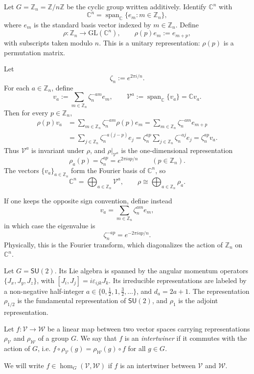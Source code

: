 \begin{example}
Let \(G=\mathbb Z_n=\mathbb Z/n\mathbb Z\) be the cyclic group written additively.
Identify \(\mathbb C^n\) with
\[
\mathbb C^n=\operatorname{span}_{\mathbb C}\{e_m:m\in\mathbb Z_n\},
\]
where \(e_m\) is the standard basis vector indexed by \(m\in\mathbb Z_n\).
Define
\[
\rho:\mathbb Z_n\to \mathrm{GL}(\mathbb C^n),
\qquad
\rho(p)e_m:=e_{m+p},
\]
with subscripts taken modulo \(n\). This is a unitary representation: \(\rho(p)\) is a permutation matrix.

Let
\[
\zeta_n:=e^{2\pi i/n}.
\]
For each \(a\in\mathbb Z_n\), define
\[
v_a:=\sum_{m\in\mathbb Z_n}\zeta_n^{-am}e_m,
\qquad
\mathscr{V}^a:=\operatorname{span}_{\mathbb C}\{v_a\}=\mathbb C v_a.
\]
Then for every \(p\in\mathbb Z_n\),
\[
\begin{aligned}
\rho(p)v_a
&=\sum_{m\in\mathbb Z_n}\zeta_n^{-am}\rho(p)e_m
=\sum_{m\in\mathbb Z_n}\zeta_n^{-am}e_{m+p} \\
&=\sum_{j\in\mathbb Z_n}\zeta_n^{-a(j-p)}e_j
=\zeta_n^{ap}\sum_{j\in\mathbb Z_n}\zeta_n^{-aj}e_j
=\zeta_n^{ap}v_a.
\end{aligned}
\]
Thus \(\mathscr{V}^a\) is invariant under \(\rho\), and \(\rho|_{\mathscr{V}^a}\) is the one-dimensional representation
\[
\rho_a(p)=\zeta_n^{ap}=e^{2\pi i ap/n}
\qquad (p\in\mathbb Z_n).
\]
The vectors \(\{v_a\}_{a\in\mathbb Z_n}\) form the Fourier basis of \(\mathbb C^n\), so
\[
\mathbb C^n=\bigoplus_{a\in\mathbb Z_n}\mathscr{V}^a,
\qquad
\rho\cong\bigoplus_{a\in\mathbb Z_n}\rho_a.
\]

If one keeps the opposite sign convention, define instead
\[
v_a=\sum_{m\in\mathbb Z_n}\zeta_n^{am}e_m,
\]
in which case the eigenvalue is
\[
\zeta_n^{-ap}=e^{-2\pi i ap/n}.
\]
Physically, this is the Fourier transform, which diagonalizes the action of $\mathbb{Z}_n$ on $\mathbb{C}^n$.
\end{example}

\begin{example}
Let $G = \mathsf{SU}(2)$. Its Lie algebra is spanned by the angular momentum operators $\{J_x,J_y,J_z\}$, with $[J_i,J_j]=i\varepsilon_{ijk}J_k$. Its irreducible representations are labeled by a non-negative half-integer $a\in\{0,\tfrac12,1,\tfrac32,\ldots\}$, and $d_a=2a+1$. The representation $\rho_{1/2}$ is the fundamental representation of $\mathsf{SU}(2)$, and $\rho_1$ is the adjoint representation. 
\end{example}

\begin{definition}
    Let $f:\mathscr{V}\to\mathscr{W}$ be a linear map between two vector spaces carrying representations $\rho_\mathscr{V}$ and $\rho_\mathscr{W}$ of a group $G$. We say that $f$ is an \emph{intertwiner} if it commutes with the action of $G$, i.e. $f\circ \rho_\mathscr{V}(g) = \rho_\mathscr{W}(g)\circ f$ for all $g\in G$.
\end{definition}
We will write $f\in\hom_G(\mathscr{V},\mathscr{W})$ if $f$ is an intertwiner between $\mathscr{V}$ and $\mathscr{W}$. 

